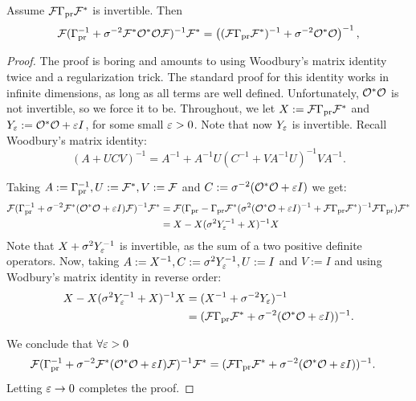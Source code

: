 \documentclass{amsart}
\numberwithin{equation}{section}
\begin{document}
\begin{lemma}\label{lemma:twice woodbury}
  Assume $\mathcal{F} \Gamma_{\textup{pr}} \mathcal{F}^*$ is invertible. Then
\begin{align*}
  \begin{split}
    \mathcal{F}( \Gamma_{\textup{pr}}^{-1} + \sigma^{-2}  \mathcal{F}^* \mathcal{O}^* \mathcal{O} \mathcal{F} )^{-1} \mathcal{F}^* 
    = \left ( (\mathcal{F}\Gamma_{\textup{pr}}\mathcal{F}^*)^{-1} + \sigma^{-2}  \mathcal{O}^* \mathcal{O} \right )^{-1},
  \end{split}
\end{align*}  
\end{lemma}
\begin{proof}
  The proof is boring and amounts to using Woodbury's matrix identity
  twice and a regularization trick. The standard proof for this
  identity works in infinite dimensions, as long as all terms are well
  defined. Unfortunately, $\mathcal{O}^*\mathcal{O}$ is not invertible, so we force
  it to be. Throughout, we let $X := \mathcal{F}\Gamma_{\textup{pr}} \mathcal{F}^*$ and $Y_{\varepsilon}
  := \mathcal{O}^*\mathcal{O} + \varepsilon I$, for some small $\varepsilon > 0$. Note that now
  $Y_{\varepsilon}$ is invertible. Recall Woodbury's matrix identity:
  $$
  (A + UCV)^{-1} = A^{-1} + A^{-1}U(C^{-1} + VA^{-1}U)^{-1}VA^{-1}.
  $$

  Taking $A := \Gamma_{\textup{pr}}^{-1}, U := \mathcal{F}^*, V := \mathcal{F}$ and $C :=
  \sigma^{-2} (\mathcal{O}^*\mathcal{O}+\varepsilon I)$ we get:
  \begin{align*}
    \begin{split}
      \mathcal{F}( \Gamma_{\textup{pr}}^{-1} + \sigma^{-2}  \mathcal{F}^* (\mathcal{O}^* \mathcal{O} +\varepsilon I) \mathcal{F} )^{-1}\mathcal{F}^* &=
      \mathcal{F} ( \Gamma_{\textup{pr}} - \Gamma_{\textup{pr}} \mathcal{F}^* ( \sigma^2(\mathcal{O}^*\mathcal{O} + \varepsilon I)^{-1} + \mathcal{F} \Gamma_{\textup{pr}} \mathcal{F}^* )^{-1} \mathcal{F} \Gamma_{\textup{pr}} ) \mathcal{F}^* \\
      &= X - X(\sigma^2Y_{\varepsilon}^{-1} + X)^{-1}X
    \end{split}
  \end{align*}
  Note that $X + \sigma^2 Y_{\varepsilon}^{-1}$ is invertible, as the sum of
  a two positive definite operators. Now, taking $A := X^{-1}, C :=
  \sigma^2Y_{\varepsilon}^{-1}, U := I$ and $V := I$ and using Wodbury's matrix
  identity in reverse order:
  \begin{align*}
    \begin{split}
      X - X(\sigma^2Y_{\varepsilon}^{-1} + X)^{-1}X &= (X^{-1} + \sigma^{-2}Y_{\varepsilon})^{-1} \\
      &= (\mathcal{F} \Gamma_{\textup{pr}} \mathcal{F}^* + \sigma^{-2} (\mathcal{O}^*\mathcal{O} + \varepsilon I))^{-1}.
    \end{split}
  \end{align*}

  We conclude that $\forall \varepsilon > 0$
  \begin{align*}
    \begin{split}
      \mathcal{F}( \Gamma_{\textup{pr}}^{-1} + \sigma^{-2}  \mathcal{F}^* (\mathcal{O}^* \mathcal{O} +\varepsilon I) \mathcal{F} )^{-1}\mathcal{F}^* 
     &= (\mathcal{F} \Gamma_{\textup{pr}} \mathcal{F}^* + \sigma^{-2} (\mathcal{O}^*\mathcal{O} + \varepsilon I))^{-1}.
    \end{split}
  \end{align*}
  Letting $\varepsilon \to 0$ completes the proof.
\end{proof}
\end{document}

